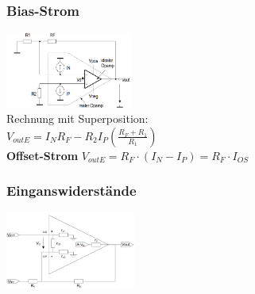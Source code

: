 \documentclass[margin=normal]{tex/hsrzf}
\begin{document}
\begin{minipage}{0.5\textwidth}
  \subsubsection*{Bias-Strom}
  \includegraphics[height=2.5cm]{img/OpAmp/Fehler_Eingangsstrom.png}
  \\ \tiny{Rechnung mit Superposition:}\\
  $V_{out E} = I_NR_F-R_2I_P(\frac{R_F+R_1}{R_1}) $\\
  \textbf{Offset-Strom}
  $V_{out E} = R_F\cdot(I_N-I_P) = R_F\cdot I_{OS}$
  \subsubsection*{Einganswiderstände}
  \includegraphics[height=2.5cm]{img/OpAmp/Fehler_Eingangswiderstand.png}\\
\end{minipage}
\end{document}
